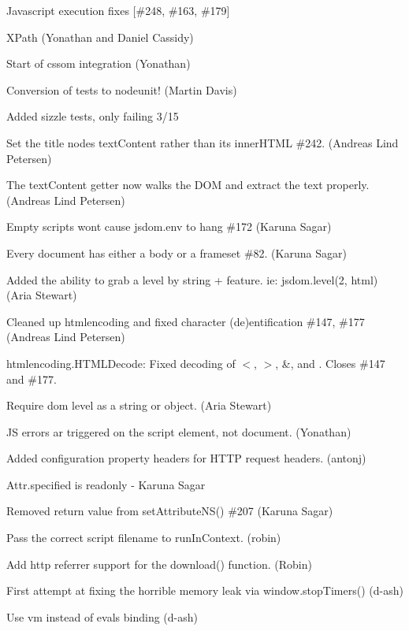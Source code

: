 \begin{DoxyItemize}
\item Javascript execution fixes \mbox{[}\#248, \#163, \#179\mbox{]}
\item X\+Path (Yonathan and Daniel Cassidy)
\item Start of cssom integration (Yonathan)
\item Conversion of tests to nodeunit! (Martin Davis)
\item Added sizzle tests, only failing 3/15
\item Set the title node\textquotesingle{}s text\+Content rather than its inner\+H\+T\+ML \#242. (Andreas Lind Petersen)
\item The text\+Content getter now walks the D\+OM and extract the text properly. (Andreas Lind Petersen)
\item Empty scripts won\textquotesingle{}t cause jsdom.\+env to hang \#172 (Karuna Sagar)
\item Every document has either a body or a frameset \#82. (Karuna Sagar)
\item Added the ability to grab a level by string + feature. ie\+: jsdom.\+level(2, \textquotesingle{}html\textquotesingle{}) (Aria Stewart)
\item Cleaned up htmlencoding and fixed character (de)entification \#147, \#177 (Andreas Lind Petersen)
\item htmlencoding.\+H\+T\+M\+L\+Decode\+: Fixed decoding of {\ttfamily $<$}, {\ttfamily $>$}, {\ttfamily \&}, and {\ttfamily \textquotesingle{}}. Closes \#147 and \#177.
\item Require dom level as a string or object. (Aria Stewart)
\item JS errors ar triggered on the script element, not document. (Yonathan)
\item Added configuration property \textquotesingle{}headers\textquotesingle{} for H\+T\+TP request headers. (antonj)
\item Attr.\+specified is readonly -\/ Karuna Sagar
\item Removed return value from set\+Attribute\+N\+S() \#207 (Karuna Sagar)
\item Pass the correct script filename to run\+In\+Context. (robin)
\item Add http referrer support for the download() function. (Robin)
\item First attempt at fixing the horrible memory leak via window.\+stop\+Timers() (d-\/ash)
\item Use vm instead of evals binding (d-\/ash)

\end{DoxyItemize}
